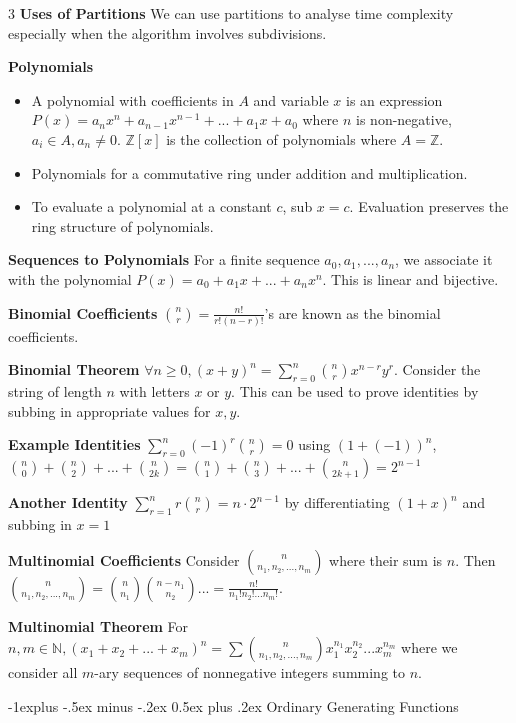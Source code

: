 \documentclass[10pt, landscape]{article}
\makeatletter
\renewcommand{\section}{\@startsection{section}{1}{0mm}%
                                {-1ex plus -.5ex minus -.2ex}%
                                {0.5ex plus .2ex}%
                                {\normalfont\large\bfseries}}
\renewcommand{\section}{\@startsection{section}{2}{0mm}%
                                {-1explus -.5ex minus -.2ex}%
                                {0.5ex plus .2ex}%
                                {\normalfont\normalsize\bfseries}}
\makeatother
\begin{document}
\begin{multicols*}{3}
\textbf{Uses of Partitions} We can use partitions to analyse time complexity especially when the algorithm involves subdivisions.

\textbf{Polynomials}
\begin{itemize}
    \item A polynomial with coefficients in $A$ and variable $x$ is an expression $P(x)=a_nx^n+a_{n-1}x^{n-1}+...+a_1x+a_0$ where $n$ is non-negative, $a_i \in A, a_n \neq 0$. $\mathbb{Z}[x]$ is the collection of polynomials where $A=\mathbb{Z}$.
    \item Polynomials for a commutative ring under addition and multiplication.
    \item To evaluate a polynomial at a constant $c$, sub $x=c$. Evaluation preserves the ring structure of polynomials.
\end{itemize}

\textbf{Sequences to Polynomials} For a finite sequence $a_0,a_1,...,a_n$, we associate it with the polynomial $P(x)=a_0+a_1x+...+a_nx^n$. This is linear and bijective.

\textbf{Binomial Coefficients} ${n \choose r}=\frac{n!}{r!(n-r)!}$'s are known as the binomial coefficients.

\textbf{Binomial Theorem} $\forall n\geq 0,(x+y)^n=\sum_{r=0}^n{n \choose r}x^{n-r}y^r$. Consider the string of length $n$ with letters $x$ or $y$. This can be used to prove identities by subbing in appropriate values for $x, y$.

\textbf{Example Identities} $\sum_{r=0}^n(-1)^r{n \choose r}=0$ using $(1+(-1))^n$, ${n \choose 0}+{n \choose 2}+...+{n \choose 2k}={n \choose 1}+{n \choose 3}+...+{n \choose 2k+1}=2^{n-1}$

\textbf{Another Identity} $\sum_{r=1}^n r {n \choose r}=n \cdot 2^{n-1}$ by differentiating $(1+x)^n$ and subbing in $x=1$

\textbf{Multinomial Coefficients} Consider ${n \choose {n_1, n_2,...,n_m}}$ where their sum is $n$. Then ${n \choose {n_1,n_2,...,n_m}}={n \choose n_1}{n - n_1 \choose n_2}...=\frac{n!}{n_1!n_2!...n_m!}$.

\textbf{Multinomial Theorem} For $n,m \in \mathbb{N}, (x_1+x_2+...+x_m)^n=\sum{n \choose {n_1,n_2,...,n_m}}x_1^{n_1}x_2^{n_2}...x_m^{n_m}$ where we consider all $m$-ary sequences of nonnegative integers summing to $n$.

\section{Ordinary Generating Functions}


\end{multicols*}
\end{document}
